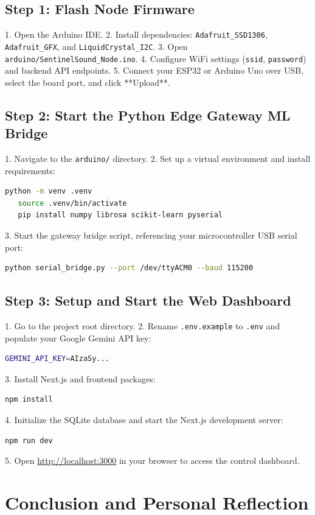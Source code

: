 \documentclass[11pt,a4paper,oneside]{report}
\begin{document}
\subsection{Step 1: Flash Node Firmware}
1. Open the Arduino IDE.
2. Install dependencies: \texttt{Adafruit\_SSD1306}, \texttt{Adafruit\_GFX}, and \texttt{LiquidCrystal\_I2C}.
3. Open \texttt{arduino/SentinelSound\_Node.ino}.
4. Configure WiFi settings (\texttt{ssid}, \texttt{password}) and backend API endpoints.
5. Connect your ESP32 or Arduino Uno over USB, select the board port, and click **Upload**.

\subsection{Step 2: Start the Python Edge Gateway ML Bridge}
1. Navigate to the \texttt{arduino/} directory.
2. Set up a virtual environment and install requirements:
   \begin{lstlisting}[language=bash]
   python -m venv .venv
   source .venv/bin/activate
   pip install numpy librosa scikit-learn pyserial
   \end{lstlisting}
3. Start the gateway bridge script, referencing your microcontroller USB serial port:
   \begin{lstlisting}[language=bash]
   python serial_bridge.py --port /dev/ttyACM0 --baud 115200
   \end{lstlisting}

\subsection{Step 3: Setup and Start the Web Dashboard}
1. Go to the project root directory.
2. Rename \texttt{.env.example} to \texttt{.env} and populate your Google Gemini API key:
   \begin{lstlisting}[language=bash]
   GEMINI_API_KEY=AIzaSy...
   \end{lstlisting}
3. Install Next.js and frontend packages:
   \begin{lstlisting}[language=bash]
   npm install
   \end{lstlisting}
4. Initialize the SQLite database and start the Next.js development server:
   \begin{lstlisting}[language=bash]
   npm run dev
   \end{lstlisting}
5. Open \href{http://localhost:3000}{http://localhost:3000} in your browser to access the control dashboard.

\section{Conclusion and Personal Reflection}
\end{document}
